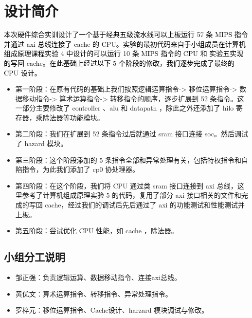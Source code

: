 \section{设计简介}
\textcolor{black}{本次硬件综合实训设计了一个基于经典五级流水线可以上板运行 57 条 MIPS 指令并通过 axi 总线连接了 cache 的 CPU。实验的最初代码来自于小组成员在计算机组成原理课程实验 4 中设计的可以运行 10 条 MIPS 指令的 CPU 和 实验五实现的写回 cache。在此基础上经过以下 5 个阶段的修改，我们逐步完成了最终的 CPU 设计。}
\begin{itemize}
    \item 第一阶段：在原有代码的基础上我们按照逻辑运算指令-> 移位运算指令-> 数据移动指令-> 算术运算指令-> 转移指令的顺序，逐步扩展到 52 条指令。这一部分主要修改了 controller 、alu 和 datapath ，除此之外还添加了 hilo 寄存器，乘除法器等功能模块。
    \item 第二阶段：我们在扩展到 52 条指令过后就通过 sram 接口连接 soc。然后调试了 hazard 模块。
    \item 第三阶段：这个阶段添加的 5 条指令全部和异常处理有关，包括特权指令和自陷指令，为此我们添加了 cp0 协处理器。
    \item 第四阶段：在这个阶段，我们将 CPU 通过类 sram 接口连接到 axi 总线，这里参考了计算机组成原理实验 5 的代码，复用了部分 axi 接口相关的文件和完成的写回 cache，经过我们的调试后先后通过了 axi 的功能测试和性能测试并上板。
    \item 第五阶段：尝试优化 CPU 性能，如 cache ，除法器。
    
\end{itemize}

\subsection{小组分工说明}


\begin{itemize}
    \item 邹正强：负责逻辑运算、数据移动指令、连接axi总线。
    \item 黄优文：算术运算指令、转移指令、异常处理指令。
    \item 罗梓元：移位运算指令、Cache设计、harzard 模块调试与修改。
\end{itemize}